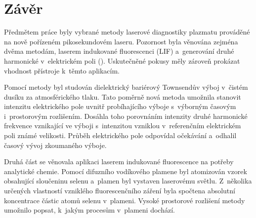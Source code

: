 \chapter*{Závěr}
Předmětem práce byly vybrané metody laserové diagnostiky plazmatu
prováděné na nově pořízeném pikosekundovém laseru.
Pozornost byla věnována zejména dvěma metodám,
laserem indukované fluorescenci (LIF)
a~generování druhé harmonické v~elektrickém poli (\EFISH{}).
Uskutečněné pokusy měly zároveň prokázat vhodnost přístroje
k~těmto aplikacím.

Pomocí metody \EFISH{} byl studován dielektrický bariérový Townsendův výboj
v~čistém dusíku za atmosférického tlaku.
Tato poměrně nová metoda umožnila stanovit intenzitu elektrického pole
uvnitř probíhajícího výboje s~výborným časovým i~prostorovým rozlišením.
Dosáhla toho porovnáním intenzity druhé harmonické frekvence vznikající
ve výboji s~intenzitou vzniklou v~referenčním elektrickém poli známé velikosti.
Průběh elektrického pole odpovídal očekávání a~odhalil časový vývoj zkoumaného
výboje.

Druhá část se věnovala aplikaci laserem indukované fluorescence
na potřeby analytické chemie.
Pomocí difuzního vodíkového plamene byl atomizován vzorek obsahující
sloučeninu selenu a~plamen byl vystaven laserovému světlu.
Z~několika určených vlastností vzniklého fluorescenčního záření
byla spočtena absolutní koncentrace částic atomů selenu v~plameni.
Vysoké prostorové rozlišení metody umožnilo popsat,
k~jakým procesům v~plameni dochází.

